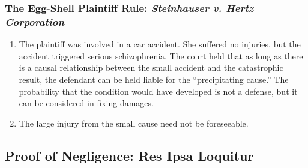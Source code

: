 \subsubsection{The Egg-Shell Plaintiff Rule: \emph{Steinhauser v. Hertz 
Corporation}}

\begin{enumerate}
    \item The plaintiff was involved in a car accident. She suffered no 
    injuries, but the accident triggered serious schizophrenia. The court held 
    that as long as there is a causal relationship between the small accident 
    and the catastrophic result, the defendant can be held liable for the 
    ``precipitating cause.'' The probability that the condition would have 
    developed is not a defense, but it can be considered in fixing damages.
    \item The large injury from the small cause need not be foreseeable.
\end{enumerate}

\subsection{Proof of Negligence: Res Ipsa Loquitur}

